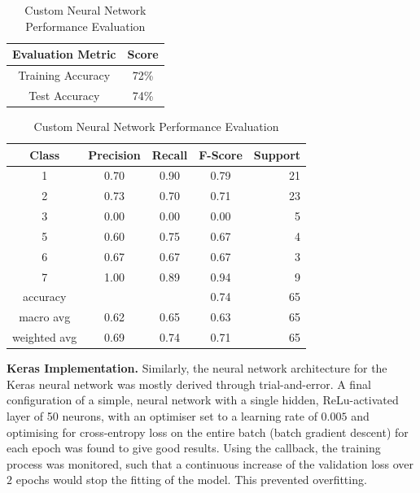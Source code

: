 \begin{table}[!ht]
\begin{subtable}[c]{0.4\textwidth}
\footnotesize
\centering
\begin{tabular}{ c | c }
 \toprule
 Evaluation Metric & Score  \\
 \midrule 
 Training Accuracy & 72\% \\
 Test Accuracy & 74\% \\
 \bottomrule
\end{tabular}
\captionsetup{justification=centering,margin=1cm}
\end{subtable}
\begin{subtable}[c]{0.6\textwidth}
\footnotesize
\centering
\begin{tabular}{c | c c c r}
Class & Precision & Recall & F-Score & Support\\
\midrule
1   &    0.70  &    0.90  &    0.79   &     21 \\
2   &    0.73  &    0.70  &    0.71   &     23 \\
3   &    0.00  &    0.00  &    0.00   &      5 \\
5   &    0.60  &    0.75  &    0.67   &      4 \\
6   &    0.67  &    0.67  &    0.67   &      3 \\
7   &    1.00  &    0.89  &    0.94   &      9 \\
\midrule
    accuracy  &          &         &   0.74  &  65 \\
   macro avg  &   0.62   &   0.65  &   0.63  &  65 \\
weighted avg  &   0.69   &   0.74  &   0.71  &  65 \\ 
\end{tabular}
\captionsetup{justification=centering,margin=1cm}
\end{subtable}
\caption{Custom Neural Network Performance Evaluation}
\label{custom_nn_evaluation}
\end{table}



\textbf{Keras Implementation. }
Similarly, the neural network architecture for the Keras neural network was mostly derived through trial-and-error. A final configuration of a simple, neural network with a single hidden, ReLu-activated layer of 50 neurons, with an  optimiser set to a learning rate of $0.005$ and optimising for cross-entropy loss on the entire batch (batch gradient descent) for each epoch was found to give good results. 
Using the  callback, the training process was monitored, such that a continuous increase of the validation loss over $2$ epochs would stop the fitting of the model. This prevented overfitting. 
\newline

